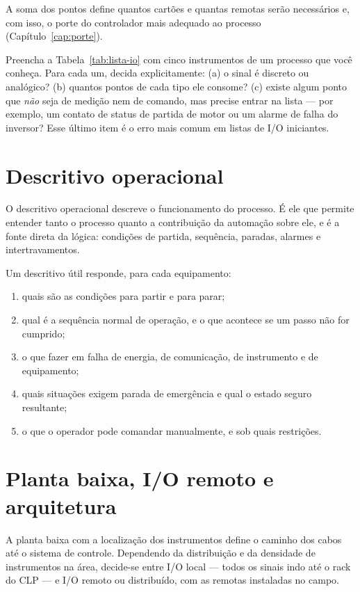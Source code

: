 A soma dos pontos define quantos cartões e quantas remotas serão necessários e, com isso, o porte
do controlador mais adequado ao processo (Capítulo~\ref{cap:porte}).

\begin{pratica}
Preencha a Tabela~\ref{tab:lista-io} com cinco instrumentos de um processo que você conheça. Para
cada um, decida explicitamente:
(a) o sinal é discreto ou analógico?
(b) quantos pontos de cada tipo ele consome?
(c) existe algum ponto que \emph{não} seja de medição nem de comando, mas precise entrar na lista
--- por exemplo, um contato de status de partida de motor ou um alarme de falha do inversor?
Esse último item é o erro mais comum em listas de I/O iniciantes.
\end{pratica}

\section{Descritivo operacional}

O descritivo operacional descreve o funcionamento do processo. É ele que permite entender tanto o
processo quanto a contribuição da automação sobre ele, e é a fonte direta da lógica: condições de
partida, sequência, paradas, alarmes e intertravamentos.

Um descritivo útil responde, para cada equipamento:

\begin{enumerate}
  \item quais são as condições para partir e para parar;
  \item qual é a sequência normal de operação, e o que acontece se um passo não for cumprido;
  \item o que fazer em falha de energia, de comunicação, de instrumento e de equipamento;
  \item quais situações exigem parada de emergência e qual o estado seguro resultante;
  \item o que o operador pode comandar manualmente, e sob quais restrições.
\end{enumerate}

\section{Planta baixa, I/O remoto e arquitetura}

A planta baixa com a localização dos instrumentos define o caminho dos cabos até o sistema de
controle. Dependendo da distribuição e da densidade de instrumentos na área, decide-se entre I/O
local --- todos os sinais indo até o rack do CLP --- e I/O remoto ou distribuído, com as remotas
instaladas no campo.

